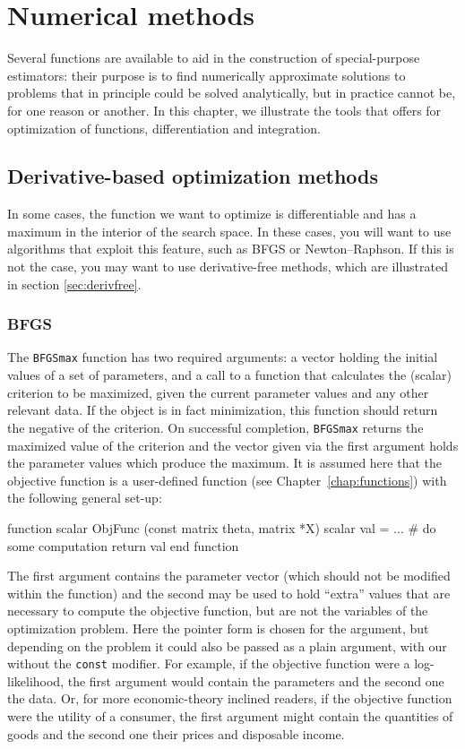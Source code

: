 \chapter{Numerical methods}
\label{chap:numerical}

Several functions are available to aid in the construction of
special-purpose estimators: their purpose is to find numerically
approximate solutions to problems that in principle could be solved
analytically, but in practice cannot be, for one reason or another. In
this chapter, we illustrate the tools that  offers for
optimization of functions, differentiation and integration.

\section{Derivative-based optimization methods}

In some cases, the function we want to optimize is differentiable and
has a maximum in the interior of the search space. In these cases, you
will want to use algorithms that exploit this feature, such as BFGS or
Newton--Raphson. If this is not the case, you may want to use
derivative-free methods, which are illustrated in section \ref{sec:derivfree}.

\subsection{BFGS}
\label{sec:BFGSmax}

The \texttt{BFGSmax} function has two required arguments: a vector
holding the initial values of a set of parameters, and a call to a
function that calculates the (scalar) criterion to be maximized, given
the current parameter values and any other relevant data.  If the
object is in fact minimization, this function should return the
negative of the criterion.  On successful completion, \texttt{BFGSmax}
returns the maximized value of the criterion and the vector given via
the first argument holds the parameter values which produce the
maximum.  It is assumed here that the objective function is a
user-defined function (see Chapter~\ref{chap:functions}) with the
following general set-up:
%
\begin{code}
function scalar ObjFunc (const matrix theta, matrix *X)
  scalar val = ...  # do some computation
  return val
end function
\end{code}

The first argument contains the parameter vector (which should not be
modified within the function) and the second may be used to hold
``extra'' values that are necessary to compute the objective function,
but are not the variables of the optimization problem. Here the pointer 
form is chosen for the argument, but depending on the problem it could
also be passed as a plain argument, with our without the \texttt{const} 
modifier. For example, if
the objective function were a log-likelihood, the first argument would
contain the parameters and the second one the data. Or, for more
economic-theory inclined readers, if the objective function were the
utility of a consumer, the first argument might contain the quantities
of goods and the second one their prices and disposable income.

